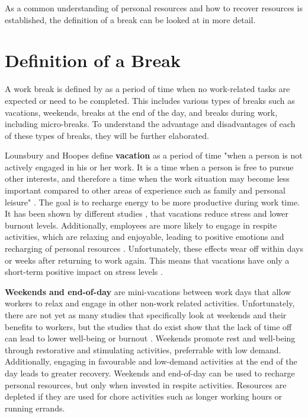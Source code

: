 \documentclass{hasel_thesis}
\begin{document}
As a common understanding of personal resources and how to recover resources is established, the definition of a break can be looked at in more detail.


\section{Definition of a Break}

A work break is defined by \cite{Trougakos.2009} as a period of time when no work-related tasks are expected or need to be completed. This includes various types of breaks such as vacations, weekends, breaks at the end of the day, and breaks during work, including micro-breaks. To understand the advantage and disadvantages of each of these types of breaks, they will be further elaborated.


Lounsbury and Hoopes \cite{Lounsbury.1986} define \textbf{vacation} as a period of time "when a person is not actively engaged in his or her work. It is a time when a person is free to pursue other interests, and therefore a time when the work situation may become less important compared to other areas of experience such as family and personal leisure" \cite[p. 393]{Lounsbury.1986}. The goal is to recharge energy to be more productive during work time. It has been shown by different studies \cite{Westman.1997, Westman.2001}, that vacations reduce stress and lower burnout levels. Additionally, employees are more likely to engage in respite activities, which are relaxing and enjoyable, leading to positive emotions and recharging of personal resources \cite{Fritz.2006}. Unfortunately, these effects wear off within days or weeks after returning to work again. This means that vacations have only a short-term positive impact on stress levels \cite{Fritz.2006}.


\textbf{Weekends and end-of-day} are mini-vacations between work days that allow workers to relax and engage in other non-work related activities. Unfortunately, there are not yet as many studies that specifically look at weekends and their benefits to workers, but the studies that do exist show that the lack of time off can lead to lower well-being or burnout \cite{Fritz.2005}. Weekends promote rest and well-being through restorative and stimulating activities, preferrable with low demand. Additionally, engaging in favourable and low-demand activities at the end of the day leads to greater recovery. Weekends and end-of-day can be used to recharge personal resources, but only when invested in respite activities. Resources are depleted if they are used for chore activities such as longer working hours or running errands.
\end{document}
